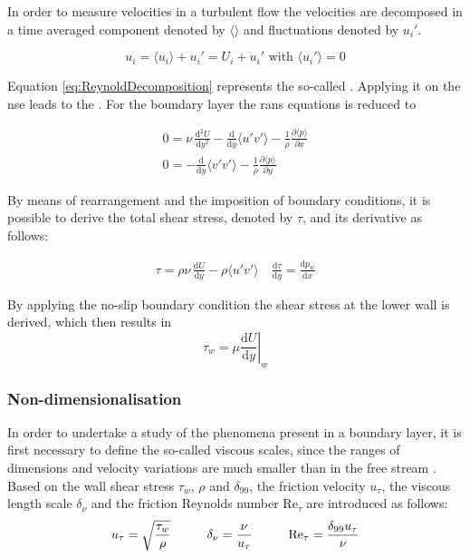 In order to measure velocities in a turbulent flow the velocities are decomposed in a time averaged component denoted by $\langle \rangle$ and fluctuations denoted by $u_i'$. 

\begin{equation}
	\label{eq:ReynoldDecomposition}
    u_i = \langle u_i \rangle + u_i' = U_i + u_i' \text{ with } \langle u_i'
\rangle = 0\end{equation}

Equation \ref{eq:ReynoldDecomposition} represents the so-called .
Applying it on the \acrshort{nse} leads to the  \citep{reynolds_iv_1895}. 
For the boundary layer the \acrshort{rans} equations is reduced to 

\begin{gather} \label{eq:rans}
    0 = \nu\,\frac{\mathrm{d}^2 U}{\mathrm{d}y^2} - \frac{\mathrm{d}}{\mathrm{d}y}\langle u'v'\rangle - \frac{1}{\rho}\frac{\partial \langle p\rangle}{\partial x} \\
    0 = -\frac{\mathrm{d}}{\mathrm{d}y}\langle v'v'\rangle - \frac{1}{\rho}\frac{\partial \langle p\rangle}{\partial y}
\end{gather}

By means of rearrangement and the imposition of boundary conditions, it is possible to derive the total shear stress, denoted by $\tau$, and its derivative as follows:

\begin{gather}
    \tau = \rho\nu\,\frac{\mathrm{d} U}{\mathrm{d}y} - \rho\langle u'v'\rangle \quad
    \frac{\mathrm{d}\tau}{\mathrm{d}y} = \frac{\mathrm{d}p_{w}}{\mathrm{d}x}
\end{gather}


By applying the no-slip boundary condition the shear stress at the lower wall is derived, which then results in
\begin{equation}
    \tau_w = \mu \left. \frac{\mathrm{d}U}{\mathrm{d}y} \right|_w
\end{equation}



\subsubsection{Non-dimensionalisation}

In order to undertake a study of the phenomena present in a boundary layer, it is first necessary to define the so-called viscous scales, since the ranges of dimensions and velocity variations are much smaller than in the free stream \citep{pope_turbulent_2015}.
%
Based on the wall shear stress $\tau_w$, $\rho$ and $\delta_{99}$, the friction velocity $u_{\tau}$, the viscous length scale $\delta_{\nu}$ and the friction Reynolds number $\mathrm{Re}_{\tau}$ are introduced as follows:
\begin{gather}
    u_{\tau} = \sqrt{\frac{\tau_w}{\rho}} \hspace{1.0cm}
    \delta_{\nu} = \frac{\nu}{u_{\tau}} \hspace{1.0cm}
    \mathrm{Re}_{\tau} = \frac{\delta_{99} u_\tau}{\nu}
\end{gather}

